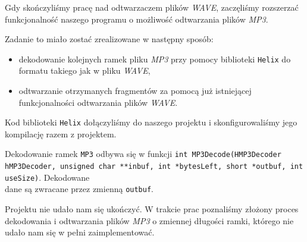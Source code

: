\documentclass[12pt,a4paper]{article}
\begin{document}
Gdy skończyliśmy pracę nad odtwarzaczem plików \emph{WAVE}, zaczęliśmy rozszerzać funkcjonalność naszego programu o możliwość odtwarzania plików \emph{MP3}.

Zadanie to miało zostać zrealizowane w następny sposób:
\begin{itemize}
 \item dekodowanie kolejnych ramek pliku \emph{MP3} przy pomocy biblioteki \texttt{Helix} do formatu takiego jak w pliku \emph{WAVE},
 \item odtwarzanie otrzymanych fragmentów za pomocą już istniejącej funkcjonalności odtwarzania plików \emph{WAVE}.
\end{itemize}

Kod biblioteki \texttt{Helix} dołączyliśmy do naszego projektu i skonfigurowaliśmy jego kompilację razem z projektem.

Dekodowanie ramek \texttt{MP3} odbywa się w funkcji \texttt{int MP3Decode(HMP3Decoder hMP3Decoder, unsigned char **inbuf, int *bytesLeft, short *outbuf, int useSize)}. Dekodowane \\ dane są zwracane przez zmienną \texttt{outbuf}.

Projektu nie udało nam się ukończyć. W trakcie prac poznaliśmy złożony proces dekodowania i odtwarzania plików \emph{MP3} o zmiennej długości ramki, którego nie udało nam się w pełni zaimplementować.
\end{document}
